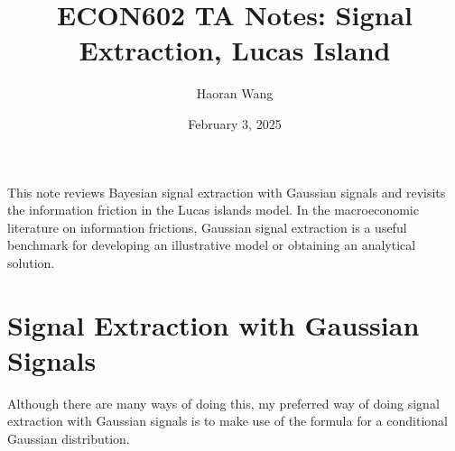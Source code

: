 \documentclass[12pt]{article}
\title{ECON602 TA Notes: Signal Extraction, Lucas Island }
\author{Haoran Wang}
\date{February 3, 2025}
\begin{document}
	\maketitle
	
	\tableofcontents 
	
		This note reviews Bayesian signal extraction with Gaussian signals and revisits the information friction in the Lucas islands model. In the macroeconomic literature on information frictions, Gaussian signal extraction is a useful benchmark for developing an illustrative model or obtaining an analytical solution.
	
	\section{Signal Extraction with Gaussian Signals}
	Although there are many ways of doing this, my preferred way of doing signal extraction with Gaussian signals is to make use of the formula for a conditional Gaussian distribution. 
	
\end{document}
